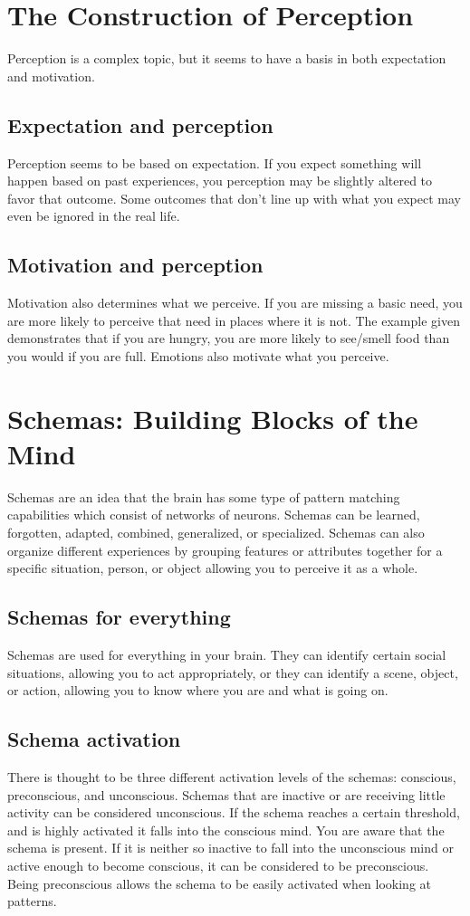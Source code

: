 \documentclass{report}
\begin{document}
\section{The Construction of Perception}
Perception is a complex topic, but it seems to have a basis in both expectation and motivation.

\subsection{Expectation and perception}
Perception seems to be based on expectation. If you expect something will happen based on past experiences, you perception may be slightly altered to favor that outcome. Some outcomes that don't line up with what you expect may even be ignored in the real life.

\subsection{Motivation and perception}
Motivation also determines what we perceive. If you are missing a basic need, you are more likely to perceive that need in places where it is not. The example given demonstrates that if you are hungry, you are more likely to see/smell food than you would if you are full. Emotions also motivate what you perceive. 

\section{Schemas: Building Blocks of the Mind}
Schemas are an idea that the brain has some type of pattern matching capabilities which consist of networks of neurons. Schemas can be learned, forgotten, adapted, combined, generalized, or specialized. Schemas can also organize different experiences by grouping features or attributes together for a specific situation, person, or object allowing you to perceive it as a whole.

\subsection{Schemas for everything}
Schemas are used for everything in your brain. They can identify certain social situations, allowing you to act appropriately, or they can identify a scene, object, or action, allowing you to know where you are and what is going on.

\subsection{Schema activation}
There is thought to be three different activation levels of the schemas: conscious, preconscious, and unconscious. Schemas that are inactive or are receiving little activity can be considered unconscious. If the schema reaches a certain threshold, and is highly activated it falls into the conscious mind. You are aware that the schema is present. If it is neither so inactive to fall into the unconscious mind or active enough to become conscious, it can be considered to be preconscious. Being preconscious allows the schema to be easily activated when looking at patterns. 
\end{document}
